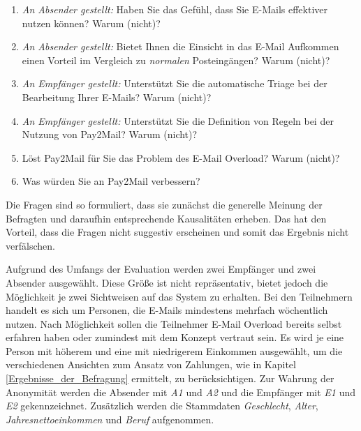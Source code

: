 \begin{enumerate}
\item \textit{An Absender gestellt:} Haben Sie das Gefühl, dass Sie E-Mails effektiver nutzen können? Warum (nicht)?
\item \textit{An Absender gestellt:} Bietet Ihnen die Einsicht in das E-Mail Aufkommen einen Vorteil im Vergleich zu \textit{normalen} Posteingängen? Warum (nicht)?
\item \textit{An Empfänger gestellt:} Unterstützt Sie die automatische Triage bei der Bearbeitung Ihrer E-Mails? Warum (nicht)?
\item \textit{An Empfänger gestellt:} Unterstützt Sie die Definition von Regeln bei der Nutzung von Pay2Mail? Warum (nicht)?
\item Löst Pay2Mail für Sie das Problem des E-Mail Overload? Warum (nicht)?
\item Was würden Sie an Pay2Mail verbessern? 
\end{enumerate}

\noindent Die Fragen sind so formuliert, dass sie zunächst die generelle Meinung der Befragten und daraufhin entsprechende Kausalitäten erheben. Das hat den Vorteil, dass die Fragen nicht suggestiv erscheinen und somit das Ergebnis nicht verfälschen.

Aufgrund des Umfangs der Evaluation werden zwei Empfänger und zwei Absender ausgewählt. Diese Größe ist nicht repräsentativ, bietet jedoch die Möglichkeit je zwei Sichtweisen auf das System zu erhalten. Bei den Teilnehmern handelt es sich um Personen, die E-Mails mindestens mehrfach wöchentlich nutzen. Nach Möglichkeit sollen die Teilnehmer E-Mail Overload bereits selbst erfahren haben oder zumindest mit dem Konzept vertraut sein. Es wird je eine Person mit höherem und eine mit niedrigerem Einkommen ausgewählt, um die verschiedenen Ansichten zum Ansatz von Zahlungen, wie in Kapitel \ref{Ergebnisse_der_Befragung} ermittelt, zu berücksichtigen. Zur Wahrung der Anonymität werden die Absender mit \textit{A1} und \textit{A2} und die Empfänger mit \textit{E1} und \textit{E2} gekennzeichnet. Zusätzlich werden die Stammdaten \textit{Geschlecht}, \textit{Alter}, \textit{Jahresnettoeinkommen} und \textit{Beruf} aufgenommen.

